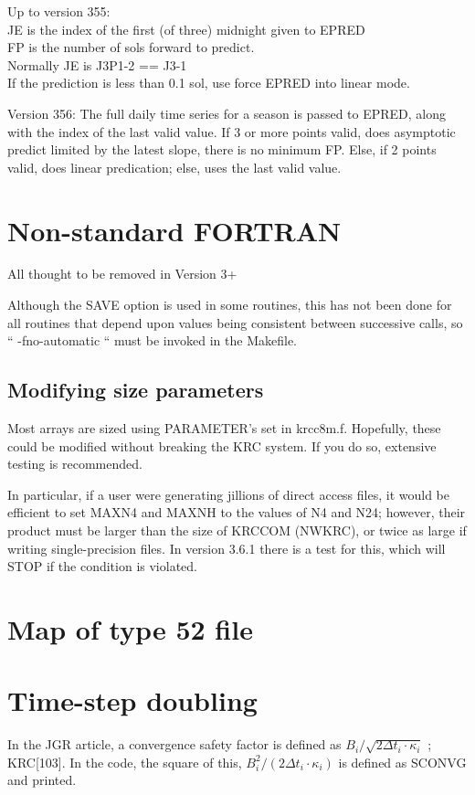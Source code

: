 \documentclass{article}
\newcommand{\qi}{\\ \hspace*{2.em}}      %
\begin{document}
Up to version 355:
\\ JE is the index  of the first (of three) midnight given to EPRED
\\ FP is the number of sols forward to predict.
\qi Normally JE is J3P1-2 == J3-1
\qi If the prediction is less than 0.1 sol, use force EPRED into linear mode.

Version 356: The full daily time series for a season is passed to EPRED, along with the index of the last valid value.  If 3 or more points valid, does asymptotic predict limited by the latest slope, there is no minimum FP.
Else, if 2 points valid, does linear predication; else, uses the last valid value.

\section{Non-standard FORTRAN}
All thought to be removed in Version 3+

Although the SAVE option is used in some routines, this has not been done for all routines that depend upon values being consistent between successive calls, so `` -fno-automatic `` must be invoked in the Makefile.

\subsection{Modifying size parameters}
Most arrays are sized using PARAMETER's set in krcc8m.f. Hopefully, these could
be modified without breaking the KRC system. If you do so, extensive testing is
recommended.

In particular, if a user were generating jillions of direct access files, it
would be efficient to set MAXN4 and MAXNH to the values of N4 and N24; however,
their product must be larger than the size of KRCCOM (NWKRC), or twice as large
if writing single-precision files. In version 3.6.1 there is a test for this,
which will STOP if the condition is violated.

\appendix %

\section{Map of type 52 file \label{type52}}


\section{Time-step doubling}
In the JGR article, a convergence safety factor is defined as $ B_i / \sqrt{ 2
  \Delta t_i \cdot \kappa_i}$ ; KRC[103]. In the code, the square of this, 
 $B_i^2 / (2 \Delta t_i \cdot \kappa_i)$ is defined as SCONVG and printed.
\end{document}
